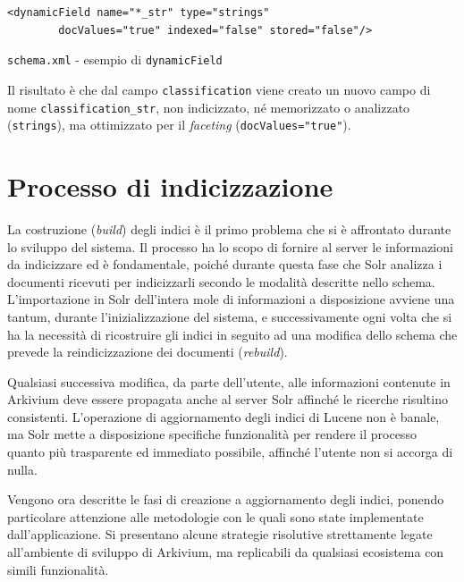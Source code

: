 \vspace{-0.3em}
\begin{listing}[H]
\begin{verbatim}
<dynamicField name="*_str" type="strings" 
		docValues="true" indexed="false" stored="false"/>
\end{verbatim}
\caption{\texttt{schema.xml} - esempio di \texttt{dynamicField}}
\label{code:schema1field5}
\end{listing}
\vspace{-1em}

Il risultato è che dal campo \texttt{classification} viene creato un nuovo campo di nome \texttt{classification\_str}, non indicizzato, né memorizzato o analizzato (\texttt{strings}), ma ottimizzato per il \textit{faceting} (\texttt{docValues="true"}).




\section{Processo di indicizzazione}
\label{sec:indexing}

La costruzione (\textit{build}) degli indici è il primo problema che si è affrontato durante lo sviluppo del sistema. Il processo ha lo scopo di fornire al server le informazioni da indicizzare ed è fondamentale, poiché durante questa fase che Solr analizza i documenti ricevuti per indicizzarli secondo le modalità descritte nello schema. L’importazione in Solr dell’intera mole di informazioni a disposizione avviene una tantum, durante l’inizializzazione del sistema, e successivamente ogni volta che si ha la necessità di ricostruire gli indici in seguito ad una modifica dello schema che prevede la reindicizzazione dei documenti (\textit{rebuild}).

Qualsiasi successiva modifica, da parte dell’utente, alle informazioni contenute in Arkivium deve essere propagata anche al server Solr affinché le ricerche risultino consistenti. L’operazione di aggiornamento degli indici di Lucene non è banale, ma Solr mette a disposizione specifiche funzionalità per rendere il processo quanto più trasparente ed immediato possibile, affinché l’utente non si accorga di nulla.

\vspace{1em}

Vengono ora descritte le fasi di creazione a aggiornamento degli indici, ponendo particolare attenzione alle metodologie con le quali sono state implementate dall’applicazione. Si presentano alcune strategie risolutive strettamente legate all’ambiente di sviluppo di Arkivium, ma replicabili da qualsiasi ecosistema con simili funzionalità.



